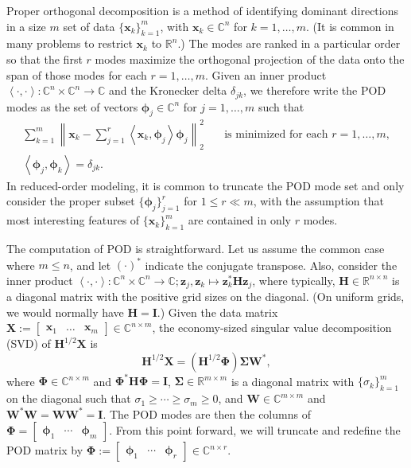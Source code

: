 \documentclass[11pt]{article}
\newcommand*{\Complex}{\mathbb{C}}
\newcommand*{\Reals}{\mathbb{R}}
\newcommand*{\half}{^{1/2}}
\newcommand*{\ip}[2]{\left<#1, #2\right>}
\renewcommand*{\H}{\mathbf{H}}
\newcommand*{\I}{\mathbf{I}}
\newcommand*{\X}{\mathbf{X}}
\newcommand*{\W}{\mathbf{W}}
\newcommand*{\PHI}{\mathbf{\Phi}}
\newcommand*{\SIGMA}{\mathbf{\Sigma}}
\newcommand*{\x}{\mathbf{x}}
\newcommand*{\z}{\mathbf{z}}
\newcommand*{\phiv}{\bm{\phi}}
\begin{document}
Proper orthogonal decomposition \citep{SirovichQAM87, HolmesTCSDSS} is a method of identifying dominant directions in a size $m$ set of data $\{\x_k\}_{k=1}^m$, with $\x_k \in \Complex^n$ for $k = 1, \ldots, m$.
(It is common in many problems to restrict $\x_k$ to $\Reals^n$.)
The modes are ranked in a particular order so that the first $r$ modes maximize the orthogonal projection of the data onto the span of those modes for each $r = 1, \ldots, m$.
Given an inner product $\ip{\cdot}{\cdot} : \Complex^n \times \Complex^n \to \Complex$ and the Kronecker delta $\delta_{jk}$, we therefore write the POD modes as the set of vectors $\phiv_j \in \Complex^n$ for $j = 1, \ldots, m$ such that
\begin{subequations}
    \begin{align}
        \sum_{k=1}^m \left\|\x_k - \sum_{j=1}^r \ip{\x_k}{\phiv_j} \phiv_j \right\|_2^2 \quad & \text{is minimized for each } r = 1, \ldots, m, \\
        \ip{\phiv_j}{\phiv_k} = \delta_{jk}.
    \end{align}
\end{subequations}
In reduced-order modeling, it is common to truncate the POD mode set and only consider the proper subset $\{\phiv_j\}_{j=1}^r$ for $1 \le r \ll m$, with the assumption that most interesting features of $\{\x_k\}_{k=1}^m$ are contained in only $r$ modes.

The computation of POD is straightforward.
Let us assume the common case where $m \le n$, and let $(\cdot)^*$ indicate the conjugate transpose.
Also, consider the inner product $\ip{\cdot}{\cdot} : \Complex^n \times \Complex^n \to \Complex; \z_j, \z_k \mapsto \z_k^* \H \z_j$, where typically, $\H \in \Reals^{n \times n}$ is a diagonal matrix with the positive grid sizes on the diagonal.
(On uniform grids, we would normally have $\H = \I$.)
Given the data matrix $\X := \begin{bmatrix} \x_1 & \ldots & \x_m \end{bmatrix} \in \Complex^{n \times m}$, the economy-sized singular value decomposition (SVD) of $\H\half \X$ is
\begin{equation}
    \label{eq:svd}
    \H\half \X = (\H\half\PHI) \SIGMA \W^*,
\end{equation}
where $\PHI \in \Complex^{n \times m}$ and $\PHI^* \H \PHI = \I$, $\SIGMA \in \Reals^{m \times m}$ is a diagonal matrix with $\{\sigma_k\}_{k=1}^m$ on the diagonal such that $\sigma_1 \ge \cdots \ge \sigma_m \ge 0$, and $\W \in \Complex^{m \times m}$ and $\W^* \W = \W \W^* = \I$.
The POD modes are then the columns of $\PHI = \begin{bmatrix} \phiv_1 & \cdots & \phiv_m \end{bmatrix}$.
From this point forward, we will truncate and redefine the POD matrix by $\PHI := \begin{bmatrix} \phiv_1 & \cdots & \phiv_r \end{bmatrix} \in \Complex^{n \times r}$.
\end{document}
